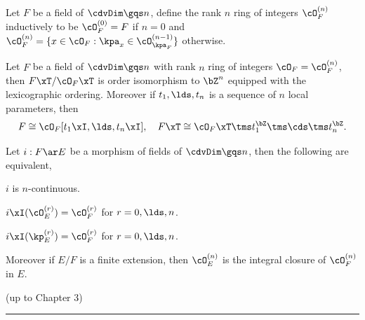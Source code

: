 \documentclass[0-main]{subfiles}
\begin{document}
\begin{dfn}[Definition~3.3]
	Let $F$ be a field of $\cdvDim\gqs n$, define the rank $n$ ring of integers $\cO_{F}^{(n)}$ inductively to be $\cO_{F}^{(0)}=F$ if $n=0$ and $\cO_{F}^{(n)}=\{x\in\cO_{F}:\kpa_{x}\in\cO_{\kpa_{F}}^{(n-1)}\}$ otherwise.
\end{dfn}

\begin{thm}
	Let $F$ be a field of $\cdvDim\gqs n$ with rank $n$ ring of integers $\cO_{F}=\cO_{F}^{(n)}$, then $F\xT/\cO_{F}\xT$ is order isomorphism to $\bZ^{n}$ equipped with the lexicographic ordering. Moreover if $t_{1},\lds,t_{n}$ is a sequence of $n$ local parameters, then
	\[
		F\cong\cO_{F}[t_{1}\xI,\lds,t_{n}\xI],\quad F\xT\cong\cO_{F}\xT\tms t_{1}^{\bZ}\tms\cds\tms t_{n}^{\bZ}.
	\]
\end{thm}

\begin{thm}
	Let $i:F\ar E$ be a morphism of fields of $\cdvDim\gqs n$, then the following are equivalent,
	\begin{itm}
			\item $i$ is $n$-continuous.
			\item $i\xI(\cO_{E}^{(r)})=\cO_{F}^{(r)}$ for $r=0,\lds,n$.
			\item $i\xI(\kp_{E}^{(r)})=\cO_{F}^{(r)}$ for $r=0,\lds,n$.
	\end{itm}

	Moreover if $E/F$ is a finite extension, then $\cO_{E}^{(n)}$ is the integral closure of $\cO_{F}^{(n)}$ in $E$.
\end{thm}

(up to Chapter 3)

\hrule

\ifSubfilesClassLoaded{
	
	
}{}
\end{document}
